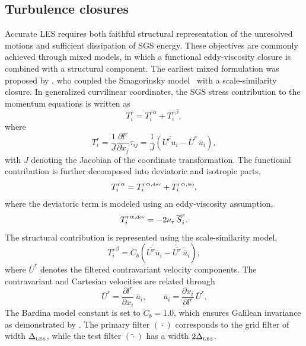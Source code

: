 \documentclass[%
superscriptaddress,
 amsmath,amssymb,
pra,
showkeys,
]{revtex4-2}
\begin{document}
\subsection{\label{sec:methodturbulencemodel}Turbulence closures}
Accurate LES requires both faithful structural representation of the unresolved motions and sufficient dissipation of SGS energy. These objectives are commonly achieved through mixed models, in which a functional eddy-viscosity closure is combined with a structural component. The earliest mixed formulation was proposed by \citet{bardina1983improved}, who coupled the Smagorinsky model~\cite{smagorinsky1963} with a scale-similarity closure. In generalized curvilinear coordinates, the SGS stress contribution to the momentum equations is written as
\begin{equation}
	T_i^{r} = {T_i^{r}}^{\alpha} + {T_i^{r}}^{\beta},
	\label{eq:contributionLES2}
\end{equation}
where
\begin{equation}
	T_i^{r}
	= \frac{1}{J}\frac{\partial l^{r}}{\partial x_j}\tau_{ij}
	= \frac{1}{J}\left( \overline{U^{r}u_i} - \overline{U}^{r}\,\overline{u}_i \right),
	\label{eq:recastCurv}
\end{equation}
with $J$ denoting the Jacobian of the coordinate transformation. The functional contribution is further decomposed into deviatoric and isotropic parts,
\begin{equation}
	{T_i^{r}}^{\alpha}
	= {T_i^{r}}^{\alpha,\hbox{\tiny dev}}
	+ {T_i^{r}}^{\alpha,\hbox{\tiny iso}},
	\label{eq:contributionLESalpha}
\end{equation}
where the deviatoric term is modeled using an eddy-viscosity assumption,
\begin{equation}
	{T_i^{r}}^{\alpha,\hbox{\tiny dev}}
	= -2\nu_{\tau}\,\overline{S}_i^{r}.
	\label{eq:isoparteddy}
\end{equation}
The structural contribution is represented using the scale-similarity model,
\begin{equation}
	{T_i^{r}}^{\beta}
	= C_b \left(
	\widetilde{\overline{U^{r}}\overline{u}_i}
	- \widetilde{\overline{U^{r}}}\,\widetilde{\overline{u}}_i
	\right),
	\label{eq:bardina}
\end{equation}
where $\overline{U}^{r}$ denotes the filtered contravariant velocity components. The contravariant and Cartesian velocities are related through
\begin{equation}
	\overline{U}^{r}
	= \frac{\partial l^{r}}{\partial x_i}\,\overline{u}_i,
	\qquad
	\overline{u}_i
	= \frac{\partial x_i}{\partial l^{r}}\,\overline{U}^{r}.
\end{equation}
The Bardina model constant is set to $C_b=1.0$, which ensures Galilean invariance as demonstrated by \citet{speziale1985galilean}. The primary filter $(\overline{\cdot})$ corresponds to the grid filter of width $\Delta_{\hbox{\tiny LES}}$, while the test filter $(\widetilde{\cdot})$ has a width $2\Delta_{\hbox{\tiny LES}}$.
\end{document}
